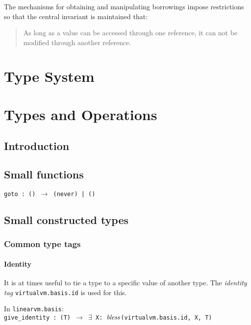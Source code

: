 \documentclass[a4paper]{book}
\newcommand\tyBless{{\ensuremath{\textnormal{\textit{bless}}}}}
\begin{document}
The mechanisms for obtaining and manipulating borrowings impose restrictions
so that the central invariant is maintained that:
\begin{quote}
  As long as a value can be accessed through one reference,
  it can not be modified through another reference.
\end{quote}


\part{Type System}


\part{Types and Operations}

\chapter{Introduction}
\chapter{Small functions}

\texttt{goto : () $\to$ (never) | ()}

\chapter{Small constructed types}

\section{Common type tags}

\subsection*{Identity}
It is at times useful to tie a type to a specific value of another type.
The \emph{identity tag} \texttt{virtualvm.basis.id} is used for this.

In \texttt{linearvm.basis}:\\
\texttt{give\_identity : (T) $\to$ $\exists$ X: \tyBless(virtualvm.basis.id, X, T)}
\end{document}
